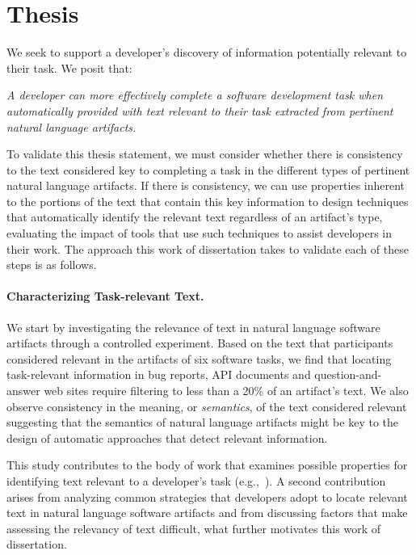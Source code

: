 

\section{Thesis}
\label{cp1:thesis}



We seek to support a developer's discovery of information potentially relevant to their task. 
We posit that:

\medskip
\begin{bluequote}
    \textit{A developer can more effectively complete a software development task when automatically provided with text relevant to their task extracted from pertinent natural language artifacts.}
\end{bluequote}
\medskip




To validate this thesis statement, 
we must consider whether there is consistency to 
the text 
considered key to completing a task
in the different types of pertinent natural language artifacts.
If there is consistency, we can use properties inherent 
to the portions of the text that contain this key information 
to design techniques that automatically identify the relevant text
regardless of an artifact's type, evaluating the impact of tools that use such techniques to assist developers in their work. 
The approach this work of dissertation takes to validate each of these steps is as follows.



\paragraph{\textbf{Characterizing Task-relevant Text.}} 


We start by investigating the relevance of text in natural language software artifacts
through a controlled experiment.
Based on the text that participants considered relevant in the artifacts of six software tasks,
we find that 
locating task-relevant information in bug
reports, API documents and question-and-answer web sites require filtering
to less than a 20\% of an artifact's text.
We also 
observe consistency in the meaning, or \textit{semantics}, of the
 text considered relevant
 suggesting that the semantics of natural language artifacts might 
 be key to the design of automatic approaches that detect relevant information.


This study contributes to the body of work that examines possible properties for identifying text relevant to a developer's task (e.g.,~\cite{Forward2002, Jiang2016b, Robillard2015, Bavota2016}).
A second contribution arises from analyzing
common strategies that developers adopt to locate relevant text
in natural language software artifacts 
and from discussing
factors that make assessing the relevancy of text difficult,
what further motivates this work of dissertation.






